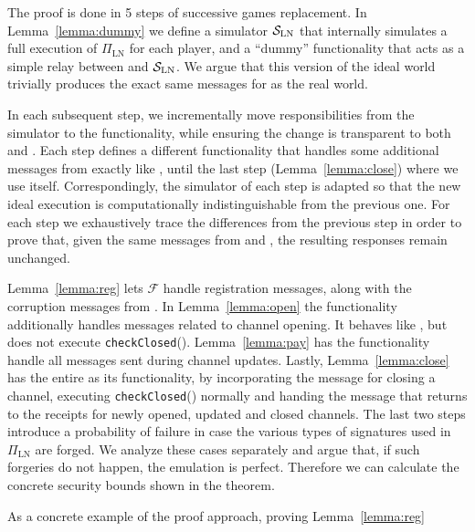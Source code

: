   \begin{proofsketch}
    The proof is done in 5 steps of successive games replacement. In
    Lemma~\ref{lemma:dummy} we define a simulator $\mathcal{S}_{\mathrm{LN}}$
    that internally simulates a full execution of $\Pi_{\mathrm{LN}}$ for each
    player, and a ``dummy'' functionality that acts as a simple relay between
    \environment{} and $\mathcal{S}_{\mathrm{LN}}$. We argue that this version of
    the ideal world trivially produces the exact same messages for
    \environment{} as the real world.

    In each subsequent step, we incrementally move responsibilities from the
    simulator to the functionality, while ensuring the change is transparent to
    both \environment{} and \adversary. Each step defines a different
    functionality that handles some additional messages from \environment{}
    exactly like \fpaynet, until the last step (Lemma~\ref{lemma:close}) where
    we use \fpaynet{} itself. Correspondingly, the simulator of each step is
    adapted so that the new ideal execution is computationally indistinguishable
    from the previous one. For each step we exhaustively trace the differences
    from the previous step in order to prove that, given the same messages from
    \environment{} and \adversary{}, the resulting responses remain unchanged.

    Lemma~\ref{lemma:reg} lets $\mathcal{F}$ handle registration messages,
    along with the corruption messages from \simulator. In Lemma~\ref{lemma:open}
    the functionality additionally handles messages related to channel opening. It
    behaves like \fpaynet, but does not execute \texttt{checkClosed}().
    Lemma~\ref{lemma:pay} has the functionality handle all messages sent during
    channel updates. Lastly, Lemma~\ref{lemma:close} has the entire \fpaynet{} as
    its functionality, by incorporating the message for closing a channel,
    executing \texttt{checkClosed}() normally and handing the message that returns
    to \environment{} the receipts for newly opened, updated and closed
    channels. The last two steps introduce a probability of failure in case
    the various types of signatures used in  $\Pi_{\mathrm{LN}}$ are forged. We analyze these cases separately and argue that, if
    such forgeries do not happen, the emulation is perfect. Therefore we can
    calculate the concrete security bounds shown in the theorem.
  \end{proofsketch}
  As a concrete example of the proof approach, proving Lemma~\ref{lemma:reg}
